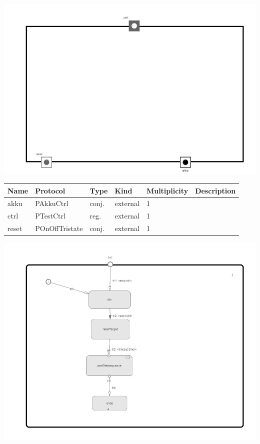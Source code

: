 
{
\centering{}
\includegraphics[width=1.0\textwidth]{./images/ABasicCommunicationTest__structure.jpg}
}

\begin{tabular}[ht]{|l|l|l|l|l|p{5cm}|}
\hline
\textbf{Name} & \textbf{Protocol} & \textbf{Type} & \textbf{Kind} & \textbf{Multiplicity} & \textbf{Description}\\
\hline
akku & PAkkuCtrl & conj. & external & 1 & \\
\hline
ctrl & PTestCtrl & reg. & external & 1 & \\
\hline
reset & POnOffTristate & conj. & external & 1 & \\
\hline
\end{tabular}

{
\centering{}
\includegraphics[width=1.0\textwidth]{./images/ABasicCommunicationTest__behavior.jpg}
}

